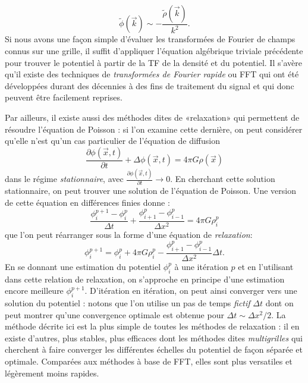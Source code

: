 \begin{equation}
\tilde \phi(\vec k)\sim -\frac{\tilde \rho(\vec k)}{k^2}.
\end{equation} 
Si nous avons une façon simple d'évaluer les transformées de Fourier de champs connus sur une grille, il suffit d'appliquer l'équation algébrique triviale précédente pour trouver le potentiel à partir de la TF de la densité et du potentiel. Il s'avère qu'il existe des techniques de \textit{transformées de Fourier rapide} ou FFT qui ont été développées durant des décennies à des fins de traitement du signal et qui donc peuvent être facilement reprises. 

Par ailleurs, il existe aussi des méthodes dites de «relaxation» qui permettent de résoudre l'équation de Poisson : si l’on examine cette dernière, on peut considérer qu'elle n'est qu'un cas particulier de l'équation de diffusion
\begin{equation}
\frac{\partial \phi(\vec x,t)}{\partial t}+\Delta \phi(\vec x,t) = 4\pi G \rho(\vec x)
\end{equation}
dans le régime \textit{stationnaire}, avec $\frac{\partial \phi(\vec x,t)}{\partial t}\rightarrow 0$. En cherchant cette solution stationnaire, on peut trouver une solution de l'équation de Poisson. Une version de cette équation en différences finies donne :
\begin{equation}
\frac{\phi^{p+1}_i-\phi^{p}_i}{\Delta t}+\frac{\phi^{p}_{i+1}-\phi^{p}_{i-1}}{\Delta x^2}=4\pi G\rho^{p}_i
\end{equation}
que l'on peut réarranger sous la forme d'une équation de \textit{relaxation}:
\begin{equation}
\phi^{p+1}_i=\phi^{p}_i+4\pi G\rho^{p}_i-\frac{\phi^{p}_{i+1}-\phi^{p}_{i-1}}{\Delta x^2}\Delta t.
\end{equation}
En se donnant une estimation du potentiel $\phi^{p}_i$ à une itération $p$ et en l'utilisant dans cette relation de relaxation, on s'approche en principe d'une estimation encore meilleure $\phi^{p+1}_i$. D'itération en itération, on peut ainsi converger vers une solution du potentiel : notons que l'on utilise un pas de temps \textit{fictif} $\Delta t$ dont on peut montrer qu'une convergence optimale est obtenue pour $\Delta t\sim \Delta x^2/2$. La méthode décrite ici est la plus simple de toutes les méthodes de relaxation : il en existe d'autres, plus stables, plus efficaces dont les méthodes dites \textit{multigrilles} qui cherchent à faire converger les différentes échelles du potentiel de façon séparée et optimale. Comparées aux méthodes à base de FFT, elles sont plus versatiles et légèrement moins rapides.

